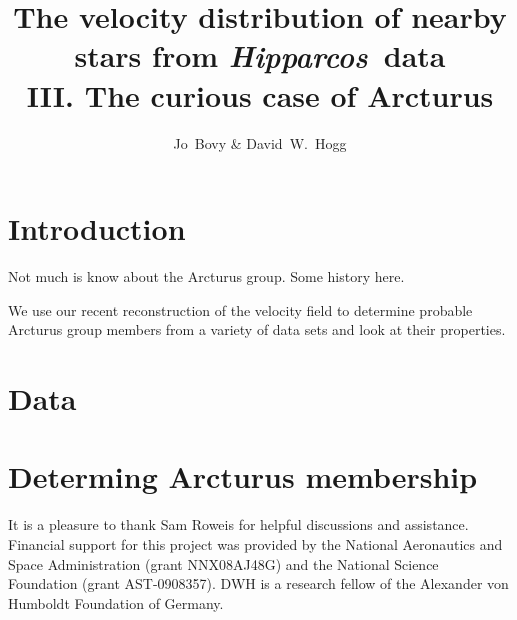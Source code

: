 \documentclass[12pt,preprint]{aastex}
\newcounter{address}
\newcommand{\Hipparcos}{\textit{Hipparcos}}
\begin{document}
\title{The velocity distribution of nearby stars from
  \Hipparcos\ data\\ III. The curious case of Arcturus}
\author{
  Jo~Bovy\altaffilmark{\ref{NYU},\ref{email}} \&
  David~W.~Hogg\altaffilmark{\ref{NYU},\ref{MPIA}}}

\begin{abstract}

\end{abstract}


\section{Introduction}

Not much is know about the Arcturus group. Some history here.

We use our recent reconstruction of the velocity field to determine
probable Arcturus group members from a variety of data sets and look
at their properties.

\section{Data}

\section{Determing Arcturus membership}

\acknowledgments It is a pleasure to thank Sam Roweis for helpful
discussions and assistance.  Financial support for this project was
provided by the National Aeronautics and Space Administration (grant
NNX08AJ48G) and the National Science Foundation (grant
AST-0908357). DWH is a research fellow of the Alexander von
Humboldt Foundation of Germany.


%
%
\end{document}
